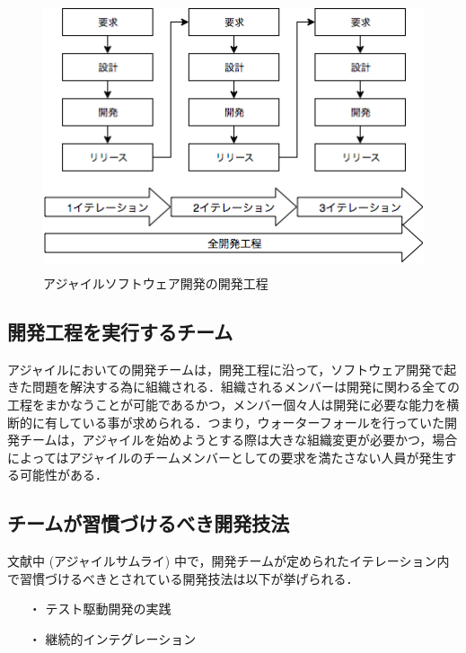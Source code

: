 \begin{figure}[H]
\centering
\includegraphics[height=8cm]{./assets/images/agile.png}
\caption{アジャイルソフトウェア開発の開発工程}
\label{fig:agile}
\end{figure}


\subsection{開発工程を実行するチーム}


アジャイルにおいての開発チームは，開発工程に沿って，ソフトウェア開発で起きた問題を解決する為に組織される．組織されるメンバーは開発に関わる全ての工程をまかなうことが可能であるかつ，メンバー個々人は開発に必要な能力を横断的に有している事が求められる．つまり，ウォーターフォールを行っていた開発チームは，アジャイルを始めようとする際は大きな組織変更が必要かつ，場合によってはアジャイルのチームメンバーとしての要求を満たさない人員が発生する可能性がある．

\subsection{チームが習慣づけるべき開発技法}


文献中 (アジャイルサムライ) 中で，開発チームが定められたイテレーション内で習慣づけるべきとされている開発技法は以下が挙げられる．

\begin{itemize}
 \item[・]テスト駆動開発の実践
 \item[・]継続的インテグレーション
\end{itemize}

